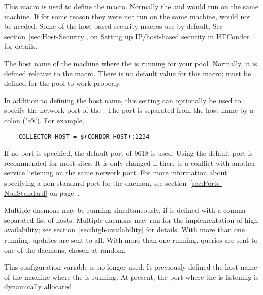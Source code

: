 \begin{description}
  
\label{param:CondorHost}
\item[\Macro{CONDOR\_HOST}]
  This macro is used to define the
   macro.  Normally the 
  and  would run on the same machine.  If for some
  reason they were not run on the same machine,
   would not be needed.  Some
  of the host-based security macros use  by
  default.  See section~\ref{sec:Host-Security}, on Setting up
  IP/host-based security in HTCondor for details.
  
\label{param:CollectorHost}
\item[\Macro{COLLECTOR\_HOST}]
  The host name of the machine where the  is running for
  your pool.  Normally, it is defined relative to
  the 
  macro.  There is no default value for this macro;
   must be defined for the pool to work
  properly.

  In addition to defining the host name, this setting can optionally be
  used to specify the network port of the .
  The port is separated from the host name by a colon ('\verb@:@').
  For example,
  \begin{verbatim}
    COLLECTOR_HOST = $(CONDOR_HOST):1234
  \end{verbatim}
  If no port is specified, the default port of 9618 is used.
  Using the default port is recommended for most sites.
  It is only changed if there is a conflict with another
  service listening on the same network port.
  For more information about specifying a non-standard port for the
   daemon,
  see section~\ref{sec:Ports-NonStandard} on
  page~\pageref{sec:Ports-NonStandard}.

  Multiple  daemons may be running simultaneously,
  if  is defined with a comma separated list of hosts.
  Multiple  daemons may run for the implementation of
  high availability; see section~\ref{sec:high-availability} for details.
  With more than one running, updates are sent to all.
  With more than one running, queries are sent to one of 
  the  daemons, chosen at random.

\label{param:NegotiatorHost} 
\item[\Macro{NEGOTIATOR\_HOST}]
  This configuration variable is no longer used.
  It previously defined the host name of the machine where 
  the  is running.
  At present, the port where the  is listening 
  is dynamically allocated. 


\end{description}
